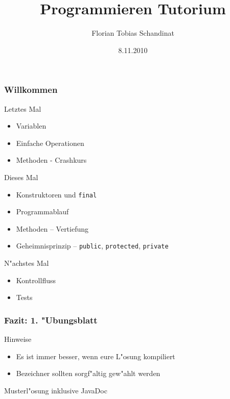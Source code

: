 \documentclass{beamer}
\title{Programmieren Tutorium}
\author{Florian Tobias Schandinat}
\date{8.11.2010}
\institute{FTS}
\begin{document}
\begin{frame}
\frametitle{Willkommen}
\pause
\begin{alertblock}{Letztes Mal}
\begin{itemize}
\item Variablen\\
\item Einfache Operationen\\
\item Methoden - Crashkurs
\end{itemize}
\end{alertblock}

\pause

\begin{block}{Dieses Mal}
\begin{itemize}
\item Konstruktoren und \texttt{final}\\
\item Programmablauf\\
\item Methoden -- Vertiefung\\
\item Geheimnisprinzip -- \texttt{public}, \texttt{protected}, \texttt{private}
\end{itemize}
\end{block}

\pause

\begin{exampleblock}{N"achstes Mal}
\begin{itemize}
\item Kontrollfluss\\
\item Tests
\end{itemize}
\end{exampleblock}
\end{frame}


\begin{frame}
\frametitle{Fazit: 1. "Ubungsblatt}
\begin{block}{Hinweise}
\begin{itemize}
\item Es ist immer besser, wenn eure L"osung kompiliert
\item Bezeichner sollten sorgf"altig gew"ahlt werden
\end{itemize}
\end{block}

\pause

\begin{block}{Musterl"osung}
inklusive JavaDoc
\end{block}
\end{frame}
\end{document}

